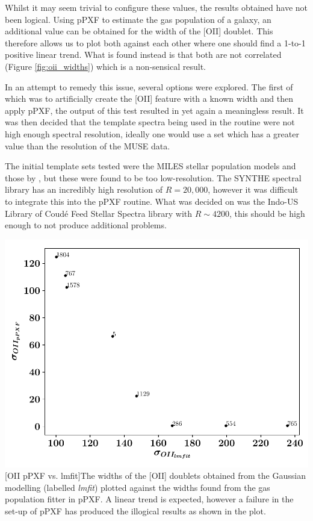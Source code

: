 \documentclass[12pt, twocolumn]{revtex4}    %
\begin{document}
Whilst it may seem trivial to configure these values, the results obtained have not been logical. Using pPXF to estimate the gas population of a galaxy, an additional value can be obtained for the width of the [OII] doublet. This therefore allows us to plot both against each other where one should find a 1-to-1 positive linear trend. What is found instead is that both are not correlated (Figure \ref{fig:oii_widths}) which is a non-sensical result. 

In an attempt to remedy this issue, several options were explored. The first of which was to artificially create the [OII] feature with a known width and then apply pPXF, the output of this test resulted in yet again a meaningless result. It was then decided that the template spectra being used in the routine were not high enough spectral resolution, ideally one would use a set which has a greater value than the resolution of the MUSE data. 


The initial template sets tested were the MILES stellar population models \citep{vazdekis_miles} and those by \cite{jacoby_spectra}, but these were found to be too low-resolution. The SYNTHE spectral library \citep{munari_synthe} has an incredibly high resolution of $R=20,000$, however it was difficult to integrate this into the pPXF routine. What was decided on was the Indo-US Library of Coud{\'e} Feed Stellar Spectra \citep{valdes_coude} library with $R\sim4200$, this should be high enough to not produce additional problems.

\begin{center}
\includegraphics[width=1.0\linewidth]{data/oii_ppxf_vs_oii_lmfit}
[OII pPXF vs. lmfit]{The widths of the [OII] doublets obtained from the Gaussian modelling (labelled \textit{lmfit}) plotted against the widths found from the gas population fitter in pPXF. A linear trend is expected, however a failure in the set-up of pPXF has produced the illogical results as shown in the plot.}
\label{fig:oii_widths}
\end{center}
\end{document}
